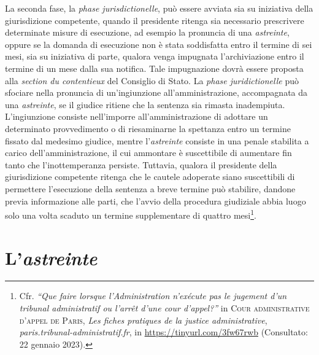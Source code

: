 \documentclass[12pt,it,a4paper,]{report}
\begin{document}
La seconda fase, la \emph{phase jurisdictionelle}, può essere avviata
sia su iniziativa della giurisdizione competente, quando il presidente
ritenga sia necessario prescrivere determinate misure di esecuzione, ad
esempio la pronuncia di una \emph{astreinte}, oppure se la domanda di
esecuzione non è stata soddisfatta entro il termine di sei mesi, sia su
iniziativa di parte, qualora venga impugnata l'archiviazione entro il
termine di un mese dalla sua notifica. Tale impugnazione dovrà essere
proposta alla \emph{section du contentieux} del Consiglio di Stato. La
\emph{phase juridictionelle} può sfociare nella pronuncia di
un'ingiunzione all'amministrazione, accompagnata da una
\emph{astreinte}, se il giudice ritiene che la sentenza sia rimasta
inadempiuta. L'ingiunzione consiste nell'imporre all'amministrazione di
adottare un determinato provvedimento o di riesaminarne la spettanza
entro un termine fissato dal medesimo giudice, mentre l'\emph{astreinte}
consiste in una penale stabilita a carico dell'amministrazione, il cui
ammontare è suscettibile di aumentare fin tanto che l'inottemperanza
persiste. Tuttavia, qualora il presidente della giurisdizione competente
ritenga che le cautele adoperate siano suscettibili di permettere
l'esecuzione della sentenza a breve termine può stabilire, dandone
previa informazione alle parti, che l'avvio della procedura giudiziale
abbia luogo solo una volta scaduto un termine supplementare di quattro
mesi\footnote{Cfr. \emph{``Que faire lorsque l'Administration n'exécute
  pas le jugement d'un tribunal administratif ou l'arrêt d'une cour
  d'appel?''} in \textsc{Cour administrative d'appel de Paris},
  \emph{Les fiches pratiques de la justice administrative},
  \emph{paris.tribunal-administratif.fr}, in
  \url{https://tinyurl.com/3fw67rwb} (Consultato: 22 gennaio 2023).}.

\hypertarget{lastreinte}{%
\section{\texorpdfstring{L'\emph{astreinte}}{L'astreinte}}\label{lastreinte}}
\end{document}
